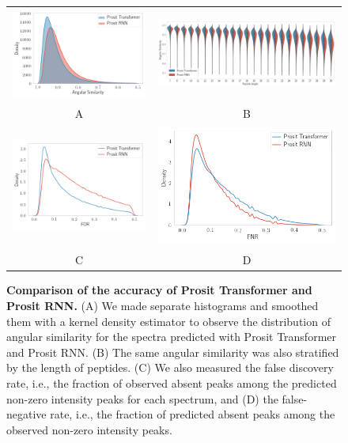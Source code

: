 \documentclass[10pt,a4paper]{article}
\begin{document}
\begin{figure}[htb]
\centering
\begin{tabular}{cc}
\includegraphics[width=6cm]{./img/spectralAngleDist.png} & \includegraphics[width=8cm]{./img/violin_sa_pepLen.png}\\
A & B \\
\includegraphics[width=6cm]{./img/fdr.png} & \includegraphics[width=6cm]{./img/fnr.png} \\
C & D
\end{tabular}
\caption{{\bf Comparison of the accuracy of Prosit Transformer and Prosit RNN.} (A) We made separate histograms and smoothed them with a kernel density estimator to observe the distribution of angular similarity for the spectra predicted with Prosit Transformer and Prosit RNN. (B) The same angular similarity was also stratified by the length of peptides. (C) We also measured the false discovery rate, i.e., the fraction of observed absent peaks among the predicted non-zero intensity peaks for each spectrum, and (D) the false-negative rate, i.e., the fraction of predicted absent peaks among the observed non-zero intensity peaks.\label{fig:performance}}
\end{figure}
\end{document}
